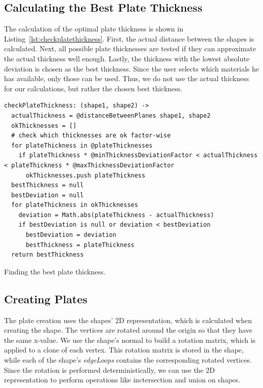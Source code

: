 \documentclass[../ClassicThesis.tex]{subfiles}
\begin{document}
\subsection{Calculating the Best Plate Thickness}

The calculation of the optimal plate thickness is shown in Listing~\ref{lst:checkplatethickness}. First, the actual distance between the shapes is calculated. Next, all possible plate thicknesses are tested if they can approximate the actual thickness well enough. Lastly, the thickness with the lowest absolute deviation is chosen as the best thickness. Since the user selects which materials he has available, only those can be used. Thus, we do not use the actual thickness for our calculations, but rather the chosen best thickness.

\begin{listing}
\begin{verbatim}
checkPlateThickness: (shape1, shape2) ->
  actualThickness = @distanceBetweenPlanes shape1, shape2
  okThicknesses = []
  # check which thicknesses are ok factor-wise
  for plateThickness in @plateThicknesses
    if plateThickness * @minThicknessDeviationFactor < actualThickness < plateThickness * @maxThicknessDeviationFactor
      okThicknesses.push plateThickness
  bestThickness = null
  bestDeviation = null
  for plateThickness in okThicknesses
    deviation = Math.abs(plateThickness - actualThickness)
    if bestDeviation is null or deviation < bestDeviation
      bestDeviation = deviation
      bestThickness = plateThickness
  return bestThickness
\end{verbatim}
\caption{Finding the best plate thickness.}
\label{lst:checkplatethickness}
\end{listing}

\subsection{Creating Plates}

The plate creation uses the shapes' 2D representation, which is calculated when creating the shape. The vertices are rotated around the origin so that they have the same x-value. We use the shape's normal to build a rotation matrix, which is applied to a clone of each vertex. This rotation matrix is stored in the shape, while each of the shape's \emph{edgeLoops} contains the corresponding rotated vertices. Since the rotation is performed deterministically, we can use the 2D representation to perform operations like inctersection and union on shapes.
\end{document}
